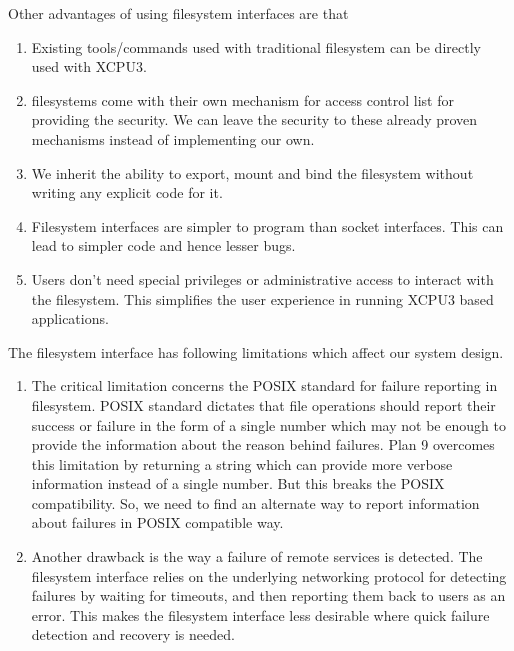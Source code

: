 Other advantages of using filesystem interfaces are that 
\begin{enumerate}
\item Existing tools/commands used with traditional filesystem can be directly
used with XCPU3.

\item filesystems come with their own mechanism for access control list for
providing the security.  We can leave the security to these already proven 
mechanisms instead of implementing our own.

\item We inherit the ability to export, mount and bind the filesystem
without writing any explicit code for it.

\item Filesystem interfaces are simpler to program than socket interfaces.  This
can lead to simpler code and hence lesser bugs.

\item Users don't need special privileges or administrative access to interact
with the filesystem.  This simplifies the user experience in running XCPU3 based
applications.
\end{enumerate}

The filesystem interface has following limitations which affect our system
design.

\begin{enumerate}

\item The critical limitation concerns the POSIX standard for failure
reporting in filesystem.  POSIX standard dictates that file operations should
report their success or failure in the form of a single number which may not be
enough to provide the information about the reason behind failures.  Plan 9
overcomes this limitation by returning a string which can provide more
verbose information instead of a single number.  But this breaks the POSIX
compatibility.  So, we need to find an alternate way to report information
about failures in POSIX compatible way.

\item Another drawback is the way a failure of remote services is detected.
The filesystem interface relies on the underlying networking protocol for
detecting failures by waiting for timeouts, and then reporting them back to
users as an error.  This makes the filesystem interface less desirable where
quick failure detection and recovery is needed.
\end{enumerate}

